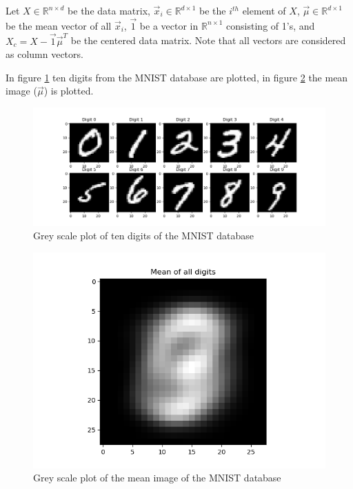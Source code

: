 \documentclass[12pt]{article}
\begin{document}
Let $X\in \mathbb{R}^{n\times d}$ be the data matrix, $\vec{x}_i \in \mathbb{R}^{d\times 1}$ be the $i^{th}$ element of $X$, $\vec{\mu} \in \mathbb{R}^{d\times 1}$ be the mean vector of all $\vec{x}_i$, $\vec{1}$ be a vector in $\mathbb{R}^{n\times 1}$ consisting of 1's, and $X_c = X - \vec{1}\vec{\mu}^T$ be the centered data matrix. Note that all vectors are considered as column vectors. \par
In figure \ref{fig:4.1.1} ten digits from the MNIST database are plotted, in figure \ref{fig:4.1.3} the mean image ($\vec{\mu}$) is plotted. \par 
 

\begin{figure}[h!]
	\centering
	\includegraphics[width=\linewidth]{../Problem_4/Problem_4.1.1.png}
	\caption{Grey scale plot of ten digits of the MNIST database}
	\label{fig:4.1.1}
\end{figure}

\begin{figure}[h!]
	\centering
	\includegraphics[width=0.66\linewidth]{../Problem_4/Problem_4.1.3_2.png}
	\caption{Grey scale plot of the mean image of the MNIST database}
	\label{fig:4.1.3}
\end{figure}
\end{document}
